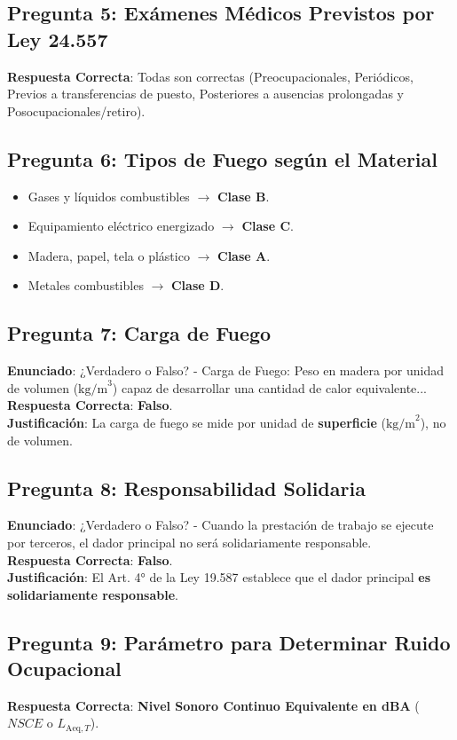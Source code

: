 \documentclass[]{informeutn}
\begin{document}
\subsection{Pregunta 5: Exámenes Médicos Previstos por Ley 24.557}
\textbf{Respuesta Correcta}: Todas son correctas (Preocupacionales, Periódicos, Previos a transferencias de puesto, Posteriores a ausencias prolongadas y Posocupacionales/retiro).

\subsection{Pregunta 6: Tipos de Fuego según el Material}
\begin{itemize}
    \item Gases y líquidos combustibles $\rightarrow$ \textbf{Clase B}.
    \item Equipamiento eléctrico energizado $\rightarrow$ \textbf{Clase C}.
    \item Madera, papel, tela o plástico $\rightarrow$ \textbf{Clase A}.
    \item Metales combustibles $\rightarrow$ \textbf{Clase D}.
\end{itemize}

\subsection{Pregunta 7: Carga de Fuego}
\textbf{Enunciado}: ¿Verdadero o Falso? - Carga de Fuego: Peso en madera por unidad de volumen ($\text{kg/m}^3$) capaz de desarrollar una cantidad de calor equivalente... \\
\textbf{Respuesta Correcta}: \textbf{Falso}. \\
\textbf{Justificación}: La carga de fuego se mide por unidad de \textbf{superficie} ($\text{kg/m}^2$), no de volumen.

\subsection{Pregunta 8: Responsabilidad Solidaria}
\textbf{Enunciado}: ¿Verdadero o Falso? - Cuando la prestación de trabajo se ejecute por terceros, el dador principal no será solidariamente responsable. \\
\textbf{Respuesta Correcta}: \textbf{Falso}. \\
\textbf{Justificación}: El Art. 4° de la Ley 19.587 establece que el dador principal \textbf{es solidariamente responsable}.

\subsection{Pregunta 9: Parámetro para Determinar Ruido Ocupacional}
\textbf{Respuesta Correcta}: \textbf{Nivel Sonoro Continuo Equivalente en dBA} ($NSCE$ o $L_{\text{Aeq},T}$).
\end{document}
